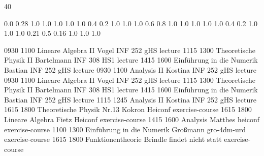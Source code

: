 \documentclass[a4paper,10pt]{report}
\begin{document}
\thispagestyle{empty}
\begin{landscape}
\noindent{}

\setslotsize{2.8cm}{0.3cm}
 {40}
\settextframe{0.8mm}

\seteventcornerradius{0pt}


			{0.0} 	{0.28}	{1.0} 	{1.0}	{1.0}	{1.0}
 	{1.0} 	{0.4} 	{0.2} 	{1.0}	{1.0}	{1.0}
   		{0.6} 	{0.8} 	{1.0} 	{1.0}	{1.0}	{1.0}
 		{1.0} 	{0.4} 	{0.2} 	{1.0}	{1.0}	{1.0}
       		{0.21}	{0.5} 	{0.16}	{1.0}	{1.0}	{1.0}

\begin{timetable}
   {0930} {1100} {Lineare Algebra II}             {Vogel}      	  {INF 252 gHS} 		{lecture}
   {1115} {1300} {Theoretische Physik II}         {Bartelmann}    {INF 308 HS1}     {lecture}
   {1415} {1600} {Einführung in die Numerik}      {Bastian}      	{INF 252 gHS}    	{lecture}
   {0930} {1100} {Analysis II}     							  {Kostina}     	{INF 252 gHS}     {lecture}
   {0930} {1100} {Lineare Algebra II}             {Vogel}         {INF 252 gHS} 		{lecture}
   {1115} {1300} {Theoretische Physik II} 		    {Bartelmann}   	{INF 308 HS1}    	{lecture}
   {1415} {1600} {Einführung in die Numerik}      {Bastian}       {INF 252 gHS}    	{lecture}
   {1115} {1245} {Analysis II}      		   				{Kostina}       {INF 252 gHS}    	{lecture}
   {1615} {1800} {Theoretische Physik}						{Nr.13 Kokron}	{Heiconf}	{exercise-course}
   {1615} {1800} {Lineare Algebra}							{Fietz}		{Heiconf}	{exercise-course}
   {1415} {1600} {Analysis}									{Matthes}		{heiconf}	{exercise-course}
   {1100} {1300} {Einführung in die Numerik}	{Großmann}		{gro-4dm-urd}	{exercise-course} 
   {1615} {1800} {Funktionentheorie}          {Brindle} {findet nicht statt} {exercise-course}
\end{timetable}
\end{landscape}
\end{document}
